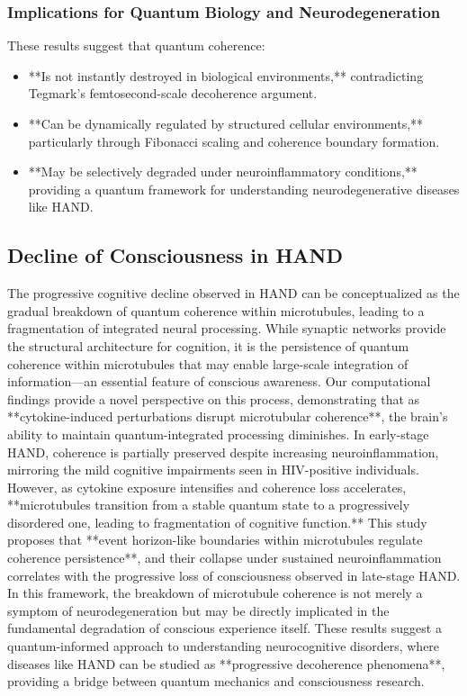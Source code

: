\documentclass[entropy,article,submit,oneauthor,pdftex,]{Definitions/mdpi}
\begin{document}
\subsubsection{Implications for Quantum Biology and Neurodegeneration}
These results suggest that quantum coherence:
\begin{itemize}
    \item **Is not instantly destroyed in biological environments,** contradicting Tegmark’s femtosecond-scale decoherence argument.
    \item **Can be dynamically regulated by structured cellular environments,** particularly through Fibonacci scaling and coherence boundary formation.
    \item **May be selectively degraded under neuroinflammatory conditions,** providing a quantum framework for understanding neurodegenerative diseases like HAND.
\end{itemize}
\subsection{Decline of Consciousness in HAND}
The progressive cognitive decline observed in HAND can be conceptualized as the gradual breakdown of quantum coherence within microtubules, leading to a fragmentation of integrated neural processing. While synaptic networks provide the structural architecture for cognition, it is the persistence of quantum coherence within microtubules that may enable large-scale integration of information—an essential feature of conscious awareness. 
Our computational findings provide a novel perspective on this process, demonstrating that as **cytokine-induced perturbations disrupt microtubular coherence**, the brain’s ability to maintain quantum-integrated processing diminishes. In early-stage HAND, coherence is partially preserved despite increasing neuroinflammation, mirroring the mild cognitive impairments seen in HIV-positive individuals. However, as cytokine exposure intensifies and coherence loss accelerates, **microtubules transition from a stable quantum state to a progressively disordered one, leading to fragmentation of cognitive function.**
This study proposes that **event horizon-like boundaries within microtubules regulate coherence persistence**, and their collapse under sustained neuroinflammation correlates with the progressive loss of consciousness observed in late-stage HAND. In this framework, the breakdown of microtubule coherence is not merely a symptom of neurodegeneration but may be directly implicated in the fundamental degradation of conscious experience itself. 
These results suggest a quantum-informed approach to understanding neurocognitive disorders, where diseases like HAND can be studied as **progressive decoherence phenomena**, providing a bridge between quantum mechanics and consciousness research.
\end{document}
